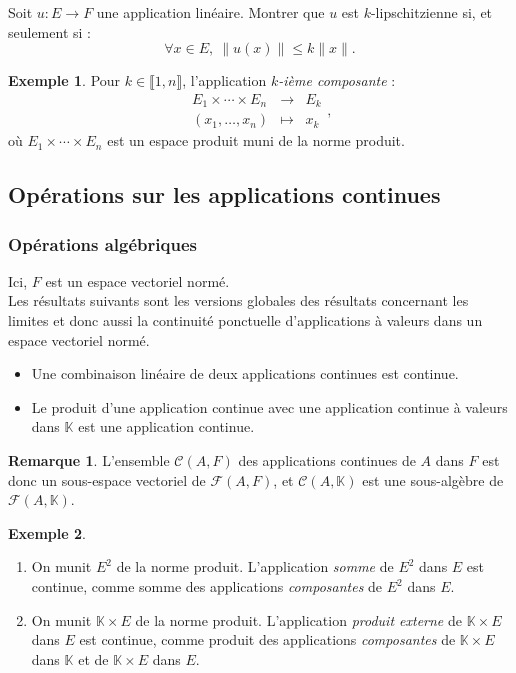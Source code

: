 \documentclass[french]{article}
\newcommand{\K}{\mathbb{K}}
\theoremstyle{plain}
\theoremstyle{definition}
\newtheorem*{ex}{Exemple}
\newtheorem*{rmq}{Remarque}
\theoremstyle{remark}
\begin{document}
\begin{exo}
	Soit $u:E\to F$ une application linéaire. Montrer que $u$ est $k$-lipschitzienne si, et seulement si : $$\forall x\in E,\ \lVert u(x)\rVert\leqslant k\lVert x\rVert.$$
\end{exo}

\begin{ex}
	Pour $k\in\llbracket1,n\rrbracket$, l'application \textit{$k$-ième composante} : $$\begin{array}{rcl}
		E_1\times\cdots\times E_n&\longrightarrow&E_k\\
		(x_1,\ldots,x_n)&\longmapsto&x_k
	\end{array},$$ où $E_1\times\cdots\times E_n$ est un espace produit muni de la norme produit.
\end{ex}

\subsection{Opérations sur les applications continues}

\subsubsection*{Opérations algébriques}
Ici, $F$ est un espace vectoriel normé.\\
Les résultats suivants sont les versions globales des résultats concernant les limites et donc aussi la continuité ponctuelle d'applications à valeurs dans un espace vectoriel normé.

\begin{prop}%
	\begin{itemize}
		\item Une combinaison linéaire de deux applications continues est continue.
		\item Le produit d'une application continue avec une application continue à valeurs dans $\K$ est une application continue.
	\end{itemize}
\end{prop}

\begin{rmq}
	L'ensemble $\mathcal{C}(A,F)$ des applications continues de $A$ dans $F$ est donc un sous-espace vectoriel de $\mathcal{F}(A,F)$, et $\mathcal{C}(A,\K)$ est une sous-algèbre de $\mathcal{F}(A,\K)$.
\end{rmq}

\begin{ex}
	\begin{enumerate}
		\item On munit $E^2$ de la norme produit. L'application \textit{somme} de $E^2$ dans $E$ est continue, comme somme des applications \textit{composantes} de $E^2$ dans $E$.
		\item On munit $\K\times E$ de la norme produit. L'application \textit{produit externe} de $\K\times E$ dans $E$ est continue, comme produit des applications \textit{composantes} de $\K\times E$ dans $\K$ et de $\K\times E$ dans $E$.
	\end{enumerate}
\end{ex}
\end{document}
